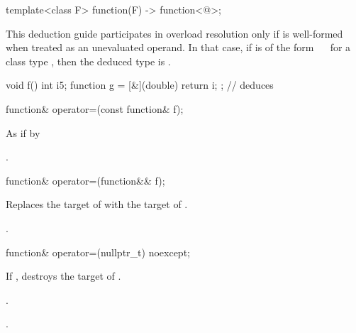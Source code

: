 \begin{itemdecl}
template<class F> function(F) -> function<@\seebelow@>;
\end{itemdecl}

\begin{itemdescr}
\pnum
\remarks This deduction guide participates in overload resolution only if
 is well-formed when treated as an unevaluated operand.
In that case, if  is of the form
~\cv{}~
for a class type , then the deduced type is .

\pnum
\begin{example}
\begin{codeblock}
void f() {
  int i{5};
  function g = [&](double) { return i; }; // deduces 
}
\end{codeblock}
\end{example}
\end{itemdescr}

%
\begin{itemdecl}
function& operator=(const function& f);
\end{itemdecl}

\begin{itemdescr}
\pnum
\effects As if by 

\pnum
\returns {}.
\end{itemdescr}

%
\begin{itemdecl}
function& operator=(function&& f);
\end{itemdecl}

\begin{itemdescr}
\pnum
\effects Replaces the target of 
with the target of .

\pnum
\returns {}.
\end{itemdescr}

%
\begin{itemdecl}
function& operator=(nullptr_t) noexcept;
\end{itemdecl}

\begin{itemdescr}
\pnum\effects If , destroys the target of .

\pnum\ensures {}.

\pnum\returns {}.
\end{itemdescr}

